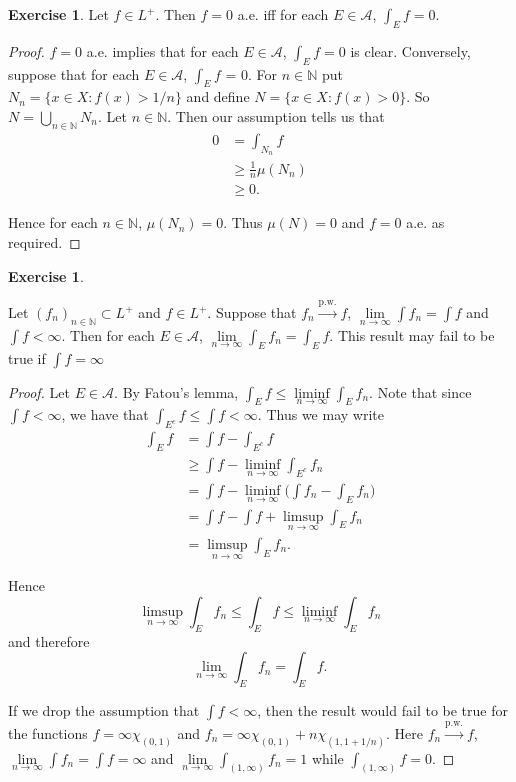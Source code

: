 \documentclass[12pt]{amsart}
\theoremstyle{definition}
\newtheorem{ex}[definition]{Exercise}
\newcommand{\N}{\mathbb{N}}
\newcommand{\MA}{\mathcal{A}}
\newcommand{\limfn}{\liminf \limits_{n \rightarrow \infty}}
\newcommand{\limpn}{\limsup \limits_{n \rightarrow \infty}}
\newcommand{\limn}{\lim \limits_{n \rightarrow \infty}}
\newcommand{\lex}[1]{\label{ex:#1}}
\begin{document}
	\begin{ex} \lex{00000} 
		Let $f \in L^+$. Then $f =0$ a.e. iff for each $E \in \MA$, $\int_E f =0$.
	\end{ex}
	
	\begin{proof}
		$f = 0$ a.e. implies that for each $E \in \MA$, $\int_E f =0$ is clear. Conversely, suppose that for each $E \in \MA$, $\int_E f$ = 0. For $n \in \N$ put $N_n = \{x \in X: f(x) > 1/n\}$ and define $N = \{x \in X: f(x)>0\}$. So $N = \bigcup\limits_{n \in \N} N_n$. Let $n \in \N$. Then our assumption tells us that 
		\begin{align*}
			0 
			&= \int_{N_n} f \\
			& \geq \frac{1}{n}\mu(N_n)\\
			& \geq 0.
		\end{align*} 
		
		Hence for each $n \in \N$, $\mu(N_n) = 0$. Thus $\mu(N) = 0$ and $f =0$ a.e. as required.
		
	\end{proof}
	
	\begin{ex} \lex{00000} 
		
		Let $(f_n)_{n \in \N} \subset L^+$ and $f \in L^+$. Suppose that $f_n \xrightarrow{\text{p.w.}} f$, $\lim \limits_{n \rightarrow \infty} \int f_n = \int f$ and $\int f < \infty$. Then for each $E \in \MA$, $\lim \limits_{n \rightarrow \infty} \int_E f_n = \int_E f$. This result may fail to be true if $\int f = \infty$
		
	\end{ex}
	
	\begin{proof}
		
		Let $E \in \MA$. By Fatou's lemma, $\int_E f \leq \limfn \int_E f_n$. Note that since $\int f < \infty$, we have that $\int_{E^c} f \leq \int f < \infty$. Thus we may write
		\begin{align*}
			\int_E f 
			&= \int f - \int_{E^c} f\\
			&\geq \int f - \limfn \int_{E^c} f_n\\
			&= \int f - \limfn \bigg(\int f_n - \int_{E} f_n\bigg)\\
			&= \int f - \int f  + \limpn \int_{E} f_n\\
			&= \limpn \int_E f_n.
		\end{align*}
		
		Hence $$\limpn \int_E f_n \leq \int_E f \leq \limfn \int_E f_n$$ and therefore $$\limn \int_E f_n = \int_E f.$$ 
		
		If we drop the assumption that $\int f < \infty$, then the result would fail to be true for the functions $f = \infty \chi_{(0,1)}$ and $ f_n = \infty \chi_{(0,1)} + n \chi_{(1,1+1/n)}$. Here $f_n \xrightarrow{\text{p.w.}} f$, $\limn \int f_n = \int f = \infty$ and $\limn \int_{(1,\infty)} f_n = 1$ while $\int_{(1,\infty)} f = 0$.  
		
	\end{proof}
	
\end{document}
